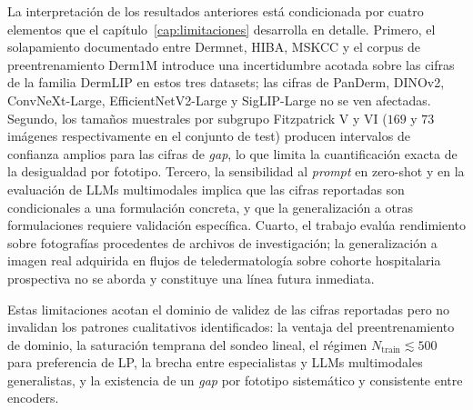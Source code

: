 La interpretación de los resultados anteriores está condicionada
por cuatro elementos que el capítulo~\ref{cap:limitaciones}
desarrolla en detalle. Primero, el solapamiento documentado entre
Dermnet, HIBA, MSKCC y el corpus de preentrenamiento Derm1M
introduce una incertidumbre acotada sobre las cifras de la
familia DermLIP en estos tres datasets; las cifras de PanDerm,
DINOv2, ConvNeXt-Large, EfficientNetV2-Large y SigLIP-Large no se
ven afectadas. Segundo, los tamaños muestrales por subgrupo
Fitzpatrick V y VI ($169$ y $73$ imágenes respectivamente
en el conjunto de test) producen intervalos de confianza amplios
para las cifras de \emph{gap}, lo que limita la cuantificación
exacta de la desigualdad por fototipo. Tercero, la sensibilidad
al \emph{prompt} en zero-shot y en la evaluación de LLMs
multimodales implica que las cifras reportadas son condicionales a
una formulación concreta, y que la generalización a otras
formulaciones requiere validación específica. Cuarto, el trabajo
evalúa rendimiento sobre fotografías procedentes de archivos de
investigación; la generalización a imagen real adquirida en
flujos de teledermatología sobre cohorte hospitalaria prospectiva
no se aborda y constituye una línea futura inmediata.

Estas limitaciones acotan el dominio de validez de las cifras
reportadas pero no invalidan los patrones cualitativos
identificados: la ventaja del preentrenamiento de dominio, la
saturación temprana del sondeo lineal, el régimen
$N_{\mathrm{train}} \lesssim 500$ para preferencia de LP, la
brecha entre especialistas y LLMs multimodales generalistas, y la
existencia de un \emph{gap} por fototipo sistemático y consistente
entre encoders.
